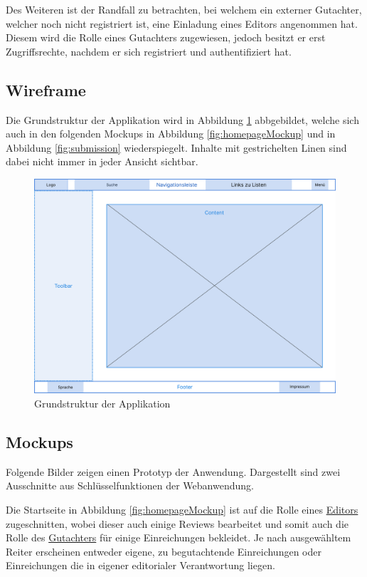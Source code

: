 Des Weiteren ist der Randfall zu betrachten, bei welchem ein externer Gutachter, welcher noch nicht registriert ist,
eine Einladung eines Editors angenommen hat.
Diesem wird die Rolle eines Gutachters zugewiesen, jedoch besitzt er erst Zugriffsrechte, nachdem er sich registriert und
authentifiziert hat.

\subsection{Wireframe}

Die Grundstruktur der Applikation wird in Abbildung \ref{fig:wireframe} abbgebildet, welche sich auch in den folgenden Mockups in Abbildung \ref{fig:homepageMockup} und in Abbildung \ref{fig:submission} wiederspiegelt.
Inhalte mit gestrichelten Linen sind dabei nicht immer in jeder Ansicht sichtbar.

\begin{figure}[H]
	\centering
	\includegraphics[width=0.85\linewidth]{graphics/Wireframe}
	\caption{Grundstruktur der Applikation}
	\label{fig:wireframe}
\end{figure}

\subsection{Mockups}

Folgende Bilder zeigen einen Prototyp der Anwendung.
Dargestellt sind zwei Ausschnitte aus Schlüsselfunktionen der Webanwendung.

Die Startseite in Abbildung \ref{fig:homepageMockup} ist auf die Rolle eines \hyperref[glo:editor]{Editors} zugeschnitten, wobei dieser auch einige
Reviews bearbeitet und somit auch die Rolle des \hyperref[glo:gutachter]{Gutachters} für einige Einreichungen bekleidet.
Je nach ausgewähltem Reiter erscheinen entweder eigene, zu begutachtende Einreichungen oder Einreichungen die in eigener editorialer Verantwortung liegen.

